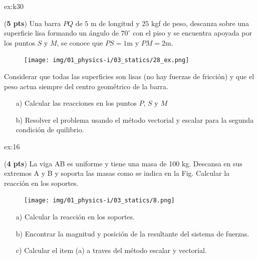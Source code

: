 \begin{multicols}{2}
    \begin{excercise}[][][a) $R_P= 25\, \mathrm{kgf}  , R_S=21.37\, \mathrm{kgf}$; b)  $R_M=21.37\ \mathrm{kgf}$]{ex:k30}{(\textbf{5 pts})
        Una barra $PQ$ de $5$ m de longitud y $25$ kgf de peso, descanza sobre una superficie lisa formando un ángulo de $70^\circ$ con el piso y se encuentra apoyada por los puntos $S$ y $M$, se conoce que $PS=1$m y $PM=2$m. 
        \begin{figure}[H]
             \centering
             \texttt{[image: img/01\_physics-i/03\_statics/28\_ex.png]}
         \end{figure} 
         Considerar que todas las superficies son lisas (no hay fuerzas de fricción) y que el peso actua siempre del centro geométrico de la barra. 
        \begin{itemize}
             \item[a)] Calcular las reacciones en los puntos $P$, $S$ y $M$ 
             \item[b)] Resolver el problema usando el método vectorial y escalar para la segunda condición de quilibrio.
         \end{itemize} 
         }
    \end{excercise}
    
    \begin{excercise}[][][$R_A=1143 \ \mathrm{N}$, $R_B=1797\ \mathrm{N}$]{ex:16}{
        (\textbf{4 pts})
         La viga AB es uniforme y tiene una masa de 100 kg. Descansa en sus extremos A y B y soporta las masas como se indica en la Fig. Calcular la reacción en los soportes.         
         \begin{figure}[H]
             \centering
             \texttt{[image: img/01\_physics-i/03\_statics/8.png]}
         \end{figure}
         \begin{itemize}
             \item[a)] Calcular la reacción en los soportes. 
             \item[b)] Encontrar la magnitud y posición de la resultante del sistema de fuerzas.
             \item[c)] Calcular el item (a) a traves del método escalar y vectorial.
         \end{itemize}
         }
     \end{excercise}


\end{multicols}
